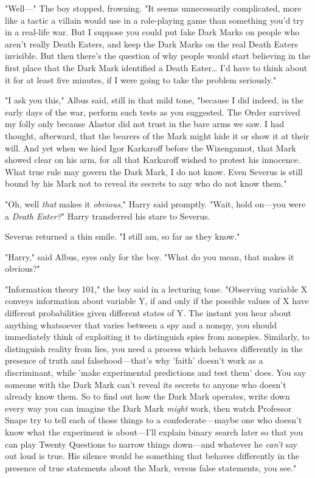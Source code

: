 "Well---" The boy stopped, frowning. "It seems unnecessarily complicated, more like a tactic a villain would use in a role-playing game than something you'd try in a real-life war. But I suppose you could put fake Dark Marks on people who aren't really Death Eaters, and keep the Dark Marks on the real Death Eaters invisible. But then there's the question of why people would start believing in the first place that the Dark Mark identified a Death Eater{\ldots} I'd have to think about it for at least five minutes, if I were going to take the problem seriously."

"I ask you this," Albus said, still in that mild tone, "because I did indeed, in the early days of the war, perform such tests as you suggested. The Order survived my folly only because Alastor did not trust in the bare arms we saw. I had thought, afterward, that the bearers of the Mark might hide it or show it at their will. And yet when we hied Igor Karkaroff before the Wizengamot, that Mark showed clear on his arm, for all that Karkaroff wished to protest his innocence. What true rule may govern the Dark Mark, I do not know. Even Severus is still bound by his Mark not to reveal its secrets to any who do not know them."

"Oh, well \emph{that} makes it \emph{obvious}," Harry said promptly. "Wait, hold on---you were a \emph{Death Eater?}" Harry transferred his stare to Severus.

Severus returned a thin smile. "I still am, so far as they know."

"Harry," said Albus, eyes only for the boy. "What do you mean, that makes it obvious?"

"Information theory 101," the boy said in a lecturing tone. "Observing variable X conveys information about variable Y, if and only if the possible values of X have different probabilities given different states of Y. The instant you hear about anything whatsoever that varies between a spy and a nonspy, you should immediately think of exploiting it to distinguish spies from nonspies. Similarly, to distinguish reality from lies, you need a process which behaves differently in the presence of truth and falsehood---that's why 'faith' doesn't work as a discriminant, while 'make experimental predictions and test them' does. You say someone with the Dark Mark can't reveal its secrets to anyone who doesn't already know them. So to find out how the Dark Mark operates, write down every way you can imagine the Dark Mark \emph{might} work, then watch Professor Snape try to tell each of those things to a confederate---maybe one who doesn't know what the experiment is about---I'll explain binary search later so that you can play Twenty Questions to narrow things down---and whatever he \emph{can't} say out loud is true. His silence would be something that behaves differently in the presence of true statements about the Mark, versus false statements, you see."

